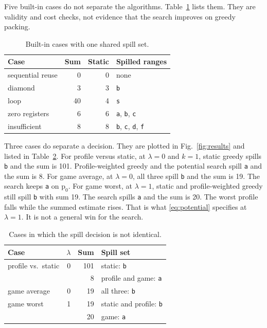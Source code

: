 \documentclass{ieeeaccess}
\begin{document}
Five built-in cases do not separate the algorithms.
Table~\ref{tab:agree} lists them.
They are validity and cost checks, not evidence that the search improves on greedy packing.

\begin{table}[t]
\caption{Built-in cases with one shared spill set.}
\label{tab:agree}
\centering
\begin{tabular}{@{}lrrl@{}}
\toprule
Case & Sum & Static & Spilled ranges \\
\midrule
sequential reuse & 0 & 0 & none \\
diamond & 3 & 3 & \texttt{b} \\
loop & 40 & 4 & \texttt{s} \\
zero registers & 6 & 6 & \texttt{a}, \texttt{b}, \texttt{c} \\
insufficient & 8 & 8 & \texttt{b}, \texttt{c}, \texttt{d}, \texttt{f} \\
\bottomrule
\end{tabular}
\end{table}

Three cases do separate a decision.
They are plotted in Fig.~\ref{fig:results} and listed in Table~\ref{tab:cases}.
For profile versus static, at $\lambda = 0$ and $k = 1$, static greedy spills \texttt{b} and the sum is 101.
Profile-weighted greedy and the potential search spill \texttt{a} and the sum is 8.
For game average, at $\lambda = 0$, all three spill \texttt{b} and the sum is 19.
The search keeps \texttt{a} on $\mathrm{p}_0$.
For game worst, at $\lambda = 1$, static and profile-weighted greedy still spill \texttt{b} with sum 19.
The search spills \texttt{a} and the sum is 20.
The worst profile falls while the summed estimate rises.
That is what \eqref{eq:potential} specifies at $\lambda = 1$.
It is not a general win for the search.

\begin{table}[t]
\caption{Cases in which the spill decision is not identical.}
\label{tab:cases}
\centering
\begin{tabular}{@{}>{\raggedright\arraybackslash}p{}rrp{}@{}}
\toprule
Case & $\lambda$ & Sum & Spill set \\
\midrule
profile vs.\ static & 0 & 101 & static: \texttt{b} \\
 &  & 8 & profile and game: \texttt{a} \\
game average & 0 & 19 & all three: \texttt{b} \\
game worst & 1 & 19 & static and profile: \texttt{b} \\
 &  & 20 & game: \texttt{a} \\
\bottomrule
\end{tabular}
\end{table}
\end{document}
